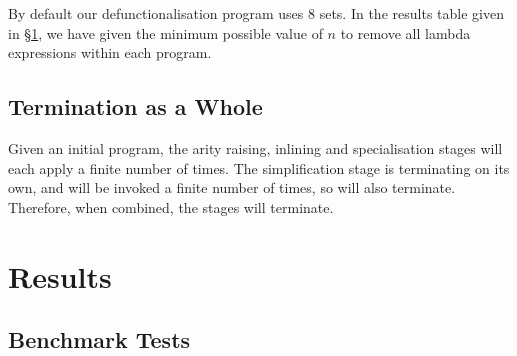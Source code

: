 By default our defunctionalisation program uses 8 sets. In the results table given in \S\ref{secF:results}, we have given the minimum possible value of $n$ to remove all lambda expressions within each program.

\subsection{Termination as a Whole}

Given an initial program, the arity raising, inlining and specialisation stages will each apply a finite number of times. The simplification stage is terminating on its own, and will be invoked a finite number of times, so will also terminate. Therefore, when combined, the stages will terminate.

\section{Results}
\label{secF:results}

\subsection{Benchmark Tests}

